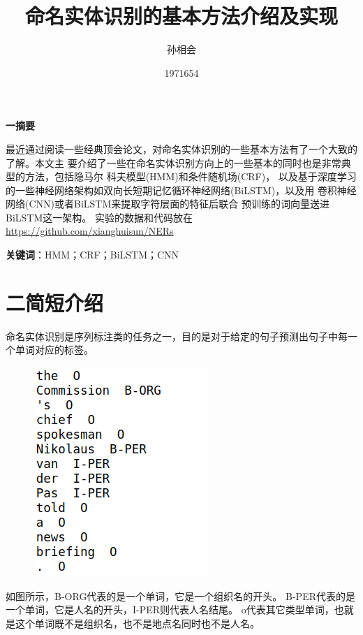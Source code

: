 \documentclass[openany,oneside]{ctexbook}
\begin{document}
\makeatletter
\newcommand\Csub{\@startsection{subsection}{2}%
 {0pt}{-\baselineskip}{.2\baselineskip}%
 {\centering\itshape}}
\newcommand\Lsub{\@startsection{subsection}{2}%
 {0pt}{-\baselineskip}{.2\baselineskip}%
 {\raggedright\sffamily}}
\newcommand\Rsub{\@startsection{subsection}{2}%
 {0pt}{-\baselineskip}{.2\baselineskip}%
 {\raggedleft\MakeUppercase}}
\newcommand\Hsub{\@startsection{subsection}{2}%
 {0pt}{-\baselineskip}{.2\baselineskip}%
 {\hrule\medskip\itshape}}
\makeatother

\pagestyle{empty} %

\mainmatter
\frontmatter
\renewcommand{\thepage}{\arabic{page}} %

\pagestyle{plain}
\title{命名实体识别的基本方法介绍及实现}
\author{孙相会}
\date{1971654}
\maketitle

\setcounter{page}{1}
\newpage

\begin{center}
   
    {\textbf{\sihao\hei \quad 一\quad 摘要}}
\end{center}

最近通过阅读一些经典顶会论文，对命名实体识别的一些基本方法有了一个大致的了解。本文主
要介绍了一些在命名实体识别方向上的一些基本的同时也是非常典型的方法，包括隐马尔
科夫模型(HMM)和条件随机场(CRF)，
以及基于深度学习的一些神经网络架构如双向长短期记忆循环神经网络(BiLSTM)，以及用
卷积神经网络(CNN)或者BiLSTM来提取字符层面的特征后联合
预训练的词向量送进BiLSTM这一架构。
实验的数据和代码放在\url{https://github.com/xianghuisun/NERs}


{\bfseries 关键词}：HMM；CRF；BiLSTM；CNN
\newpage

\chapter{\sihao\hei 二\quad 简短介绍}
命名实体识别是序列标注类的任务之一，目的是对于给定的句子预测出句子中每一个单词对应的标签。
\begin{figure}[htp]
    \centering
    \includegraphics[scale=0.5]{data_print.png}
\end{figure}
如图所示，B-ORG代表的是一个单词，它是一个组织名的开头。
B-PER代表的是一个单词，它是人名的开头，I-PER则代表人名结尾。
o代表其它类型单词，也就是这个单词既不是组织名，也不是地点名同时也不是人名。
\end{document}
